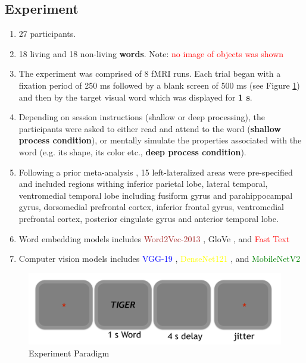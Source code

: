 \documentclass{sciposter}
\begin{document}
\begin{multicols}{3}
\section{Experiment}

\begin{enumerate}
    \large
    \item 27 participants.
    \item 18 living and 18 non-living \textbf{words}. Note: \textcolor{red}{no image of objects was shown}
    \item The experiment was comprised of 8 fMRI runs.  Each trial began with a fixation period of 250 ms followed by a blank screen of 500 ms (see Figure \ref{fig1}) and then by the target visual word which was displayed for \textbf{1 s}.
    \item Depending on session instructions (shallow or deep processing), the participants were asked  to either read and attend to the word (\textbf{shallow process condition}), or mentally simulate the properties associated with the word (e.g. its shape, its color etc., \textbf{deep process condition}).
    \item Following  a prior meta-analysis \cite{binder2009a}, 15 left-lateralized areas were pre-specified and included regions withing inferior parietal lobe, lateral temporal, ventromedial temporal lobe including fusiform gyrus and parahippocampal gyrus, dorsomedial prefrontal cortex, inferior frontal gyrus, ventromedial prefrontal cortex, posterior cingulate gyrus and anterior temporal lobe.
    \item Word embedding models includes \textcolor{brown}{Word2Vec-2013} \cite{mikolov2013a}, \textcolor{RubineRed}{GloVe} \cite{Pennnigton2014a}, and \textcolor{red}{Fast Text} \cite{bojanowski2016a}
    \item Computer vision models includes \textcolor{blue}{VGG-19} \cite{simonyan2014very}, \textcolor{yellow}{DenseNet121} \cite{howard2017mobilenets}, and \textcolor{green}{MobileNetV2} \cite{huang2017densely}
\end{enumerate}

\begin{figure}
    \centering
    \includegraphics[width=1.\linewidth]{paradigm.png}
    \caption{Experiment Paradigm}
    \label{fig1}
\end{figure}


\end{multicols}
\end{document}
